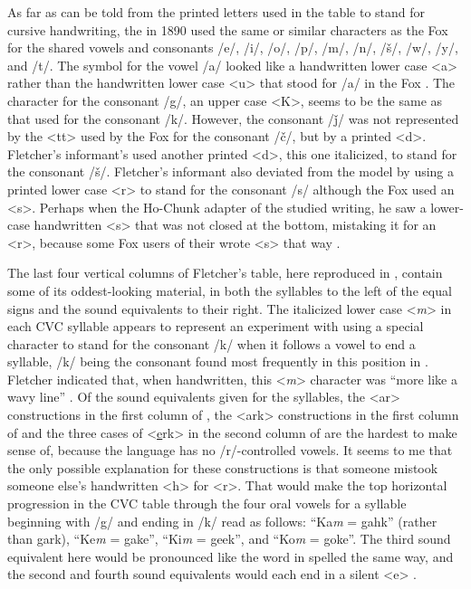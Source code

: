 \documentclass[output=paper]{LSP/langsci}
\begin{document}
As far as can be told from the printed letters used in the table to stand for cursive handwriting, the   in 1890 used the same or similar characters as the Fox  for the shared vowels and consonants /e/, /i/, /o/, /p/, /m/, /n/, /\v{s}/, /w/, /y/, and /t/. The  symbol for the vowel /a/ looked like a handwritten lower case <a> rather than the handwritten lower case <u> that stood for /a/ in the Fox . The  character for the consonant /g/, an upper case <K>, seems to be the same as that used for the  consonant /k/. However, the  consonant /\v{j}/ was not represented by the <tt> used by the Fox for the consonant /\v{c}/, but by a printed <d>. Fletcher's informant's  used another printed <d>, this one italicized, to stand for the consonant /\v{s}/. Fletcher's informant also deviated from the  model by using a printed lower case <r> to stand for the consonant /s/ although the Fox  used an <s>. Perhaps when the Ho-Chunk adapter of the  studied   writing, he saw a lower-case handwritten <s> that was not closed at the bottom, mistaking it for an <r>, because some Fox users of their  wrote <s> that way \citep[170]{Walker1996}.  

The last four vertical columns of Fletcher's table, here reproduced in , contain some of its oddest-looking material, in both the  syllables to the left of the equal signs and the  sound equivalents to their right. The italicized lower case <\emph{m}> in each CVC  syllable appears to represent an experiment with using a special character to stand for the consonant /k/ when it follows a vowel to end a syllable, /k/ being the consonant found most frequently in this position in . Fletcher indicated that, when handwritten, this <\emph{m}> character was ``more like a wavy line'' \citeyearpar[300]{Fletcher1890a}. Of the  sound equivalents given for the  syllables, the <ar> constructions in the first column of , the <ark> constructions in the first column of  and the three cases of <\underline{e}rk> in the second column of  are the hardest to make sense of, because the  language has no /r/-controlled vowels. It seems to me that the only possible explanation for these constructions is that someone mistook someone else's handwritten <h> for <r>. That would make the top horizontal progression in the CVC table through the four oral vowels for a syllable beginning with /g/ and ending in /k/ read as follows: ``Ka\emph{m} = gahk'' (rather than gark), ``Ke\emph{m} = gake'', ``Ki\emph{m} = geek'', and ``Ko\emph{m} = goke''. The third  sound equivalent here would be pronounced like the word in  spelled the same way, and the second and fourth  sound equivalents would each end in a silent <e> \citep[300]{Fletcher1890a}. 
\end{document}
